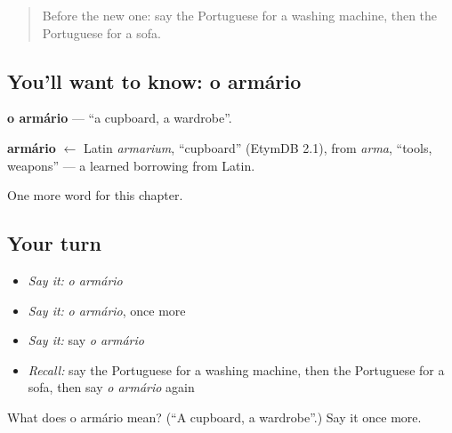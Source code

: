 \label{lesson:PT-C96-armario}



\begin{quote}
Before the new one: say the Portuguese for a washing machine, then the Portuguese for a sofa.
\end{quote}

\subsection*{You'll want to know: o armário}
\textbf{o armário} — \textquotedblleft{}a cupboard, a wardrobe\textquotedblright{}.

\begin{cousinweb}
\textbf{armário} $\leftarrow$ Latin \emph{armarium}, \textquotedblleft{}cupboard\textquotedblright{} (EtymDB 2.1), from \emph{arma}, \textquotedblleft{}tools, weapons\textquotedblright{} — a learned borrowing from Latin.
\end{cousinweb}

\begin{grammarlens}[title={What you've built}]
One more word for this chapter.
\end{grammarlens}

\subsection*{Your turn}
\begin{itemize}
\raggedright
  \item \emph{Say it:} \emph{o armário}
  \item \emph{Say it:} \emph{o armário}, once more
  \item \emph{Say it:} say \emph{o armário}
  \item \emph{Recall:} say the Portuguese for a washing machine, then the Portuguese for a sofa, then say \emph{o armário} again
\end{itemize}

\begin{tcolorbox}[breakable,colback=teal!4,colframe=teal!35!black,title={Before you move on}]
What does o armário mean? (\textquotedblleft{}A cupboard, a wardrobe\textquotedblright{}.) Say it once more.
\end{tcolorbox}
